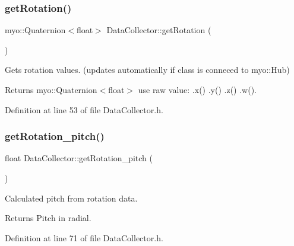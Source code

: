 \subsubsection{\texorpdfstring{get\+Rotation()}{getRotation()}}
{\footnotesize\ttfamily myo\+::\+Quaternion$<$float$>$ Data\+Collector\+::get\+Rotation (\begin{DoxyParamCaption}{ }\end{DoxyParamCaption})\hspace{0.3cm}{\ttfamily [inline]}}



Gets rotation values. (updates automatically if class is conneced to myo\+::\+Hub) 

\begin{DoxyReturn}{Returns}
myo\+::\+Quaternion$<$float$>$ use raw value\+: .x() .y() .z() .w(). 
\end{DoxyReturn}


Definition at line 53 of file Data\+Collector.\+h.

\mbox{\label{class_data_collector_a603dbbfb9d59838c775f51e1e695e638}} 
\subsubsection{\texorpdfstring{get\+Rotation\+\_\+pitch()}{getRotation\_pitch()}}
{\footnotesize\ttfamily float Data\+Collector\+::get\+Rotation\+\_\+pitch (\begin{DoxyParamCaption}{ }\end{DoxyParamCaption})\hspace{0.3cm}{\ttfamily [inline]}}



Calculated pitch from rotation data. 

\begin{DoxyReturn}{Returns}
Pitch in radial. 
\end{DoxyReturn}


Definition at line 71 of file Data\+Collector.\+h.

\mbox{\label{class_data_collector_a4e761ba292f93b5ac18e05a860a697ab}} 
